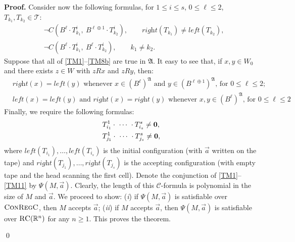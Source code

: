 \documentclass{LMCS}
\renewenvironment{proof}{\par\noindent\textbf{Proof.}}{\mbox{}\qed\par\medskip}
\theoremstyle{plain}
\newcommand{\cBC}{\ensuremath{\mathcal{C}}}
\newcommand{\ConR}{\textsc{ConRegC}}
\begin{document}
\begin{proof}
Consider now the following formulas, for $1 \leq i \leq s$, $0 \leq \ell \leq 2$, $T_{k_1},T_{k_2}\in \mathcal{T}$:
\begin{align}\label{TM8}
& \neg C(B^{\ell} \cdot T_{k_1}^i, \ B^{\ell\oplus 1} \cdot T_{k_2}^i),\qquad\textit{right}(T_{k_1})\ne\textit{left}(T_{k_2}),
\\ \label{TM8b}
& \neg C(B^\ell \cdot T_{k_1}^i, \ B^\ell \cdot T_{k_2}^i),\qquad k_1 \ne k_2.
\end{align}
Suppose that all of \eqref{TM1}--\eqref{TM8b} are true in $\mathfrak
A$. It easy to see that, if $x,y \in W_0$ and there exists $z\in W$
with $zRx$ and $zRy$, then:
\begin{align}
& \text{$\textit{right}(x)= \textit{left}(y)$ whenever
   $x\in (B^\ell)^\mathfrak{A}$ and $y\in (B^{\ell\oplus 1})^\mathfrak{A}$,
   for $0 \leq \ell \leq 2$};
\label{eq:easy1}\\
& \text{$\textit{left}(x)= \textit{left}(y)$ and
       $\textit{right}(x)= \textit{right}(y)$ whenever
       $x,y \in (B^\ell)^\mathfrak{A}$, for $0 \leq \ell \leq 2$}.
\label{eq:easy2}
\end{align}
Finally, we require the following formulas:
\begin{align}
& T_{i_1}^1 \cdot \ \cdots \ \cdot T_{i_s}^s \ne \mathbf{0},\label{TM10}\\
& T_{j_1}^1 \cdot \ \cdots \ \cdot T_{j_s}^s \ne \mathbf{0},\label{TM11}\end{align}
where $\textit{left}(T_{i_1}),\dots, \textit{left}(T_{i_s})$ is the
initial configuration (with $\vec{a}$ written on the tape) and
$\textit{right}(T_{j_1}),\dots, \textit{right}(T_{j_s})$ is the
accepting configuration (with empty tape and the head scanning the
first cell). Denote the conjunction of \eqref{TM1}--\eqref{TM11} by
$\Psi(M,\vec{a})$. Clearly, the length of this \cBC{}-formula  is
polynomial in the size of $M$ and $\vec{a}$.  We proceed to show:
({\em i}) if $\Psi(M,\vec{a})$ is satisfiable over $\ConR$,  then $M$
accepts $\vec{a}$; ({\em ii}) if $M$ accepts $\vec{a}$, then
$\Psi(M,\vec{a})$ is satisfiable over $\textsc{RC}(\mathbb{R}^n)$ for any $n \geq
1$. This proves the theorem.


\end{proof}
\end{document}
